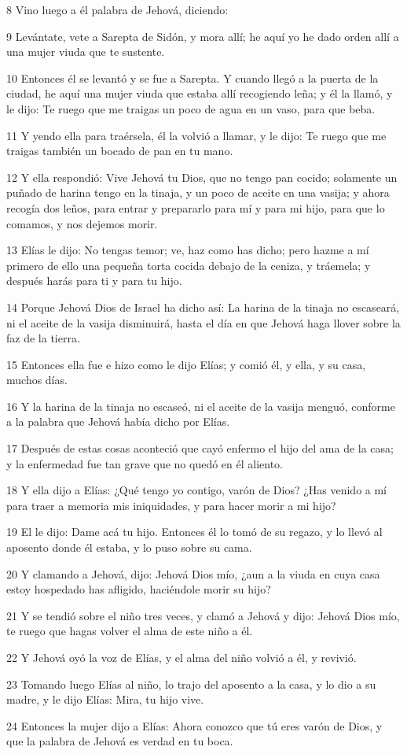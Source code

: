 \par 8 Vino luego a él palabra de Jehová, diciendo:
\par 9 Levántate, vete a Sarepta de Sidón, y mora allí; he aquí yo he dado orden allí a una mujer viuda que te sustente.
\par 10 Entonces él se levantó y se fue a Sarepta. Y cuando llegó a la puerta de la ciudad, he aquí una mujer viuda que estaba allí recogiendo leña; y él la llamó, y le dijo: Te ruego que me traigas un poco de agua en un vaso, para que beba.
\par 11 Y yendo ella para traérsela, él la volvió a llamar, y le dijo: Te ruego que me traigas también un bocado de pan en tu mano.
\par 12 Y ella respondió: Vive Jehová tu Dios, que no tengo pan cocido; solamente un puñado de harina tengo en la tinaja, y un poco de aceite en una vasija; y ahora recogía dos leños, para entrar y prepararlo para mí y para mi hijo, para que lo comamos, y nos dejemos morir. 
\par 13 Elías le dijo: No tengas temor; ve, haz como has dicho; pero hazme a mí primero de ello una pequeña torta cocida debajo de la ceniza, y tráemela; y después harás para ti y para tu hijo.
\par 14 Porque Jehová Dios de Israel ha dicho así: La harina de la tinaja no escaseará, ni el aceite de la vasija disminuirá, hasta el día en que Jehová haga llover sobre la faz de la tierra.
\par 15 Entonces ella fue e hizo como le dijo Elías; y comió él, y ella, y su casa, muchos días.
\par 16 Y la harina de la tinaja no escaseó, ni el aceite de la vasija menguó, conforme a la palabra que Jehová había dicho por Elías.
\par 17 Después de estas cosas aconteció que cayó enfermo el hijo del ama de la casa; y la enfermedad fue tan grave que no quedó en él aliento.
\par 18 Y ella dijo a Elías: ¿Qué tengo yo contigo, varón de Dios? ¿Has venido a mí para traer a memoria mis iniquidades, y para hacer morir a mi hijo?
\par 19 El le dijo: Dame acá tu hijo. Entonces él lo tomó de su regazo, y lo llevó al aposento donde él estaba, y lo puso sobre su cama.
\par 20 Y clamando a Jehová, dijo: Jehová Dios mío, ¿aun a la viuda en cuya casa estoy hospedado has afligido, haciéndole morir su hijo?
\par 21 Y se tendió sobre el niño tres veces, y clamó a Jehová y dijo: Jehová Dios mío, te ruego que hagas volver el alma de este niño a él.
\par 22 Y Jehová oyó la voz de Elías, y el alma del niño volvió a él, y revivió.
\par 23 Tomando luego Elías al niño, lo trajo del aposento a la casa, y lo dio a su madre, y le dijo Elías: Mira, tu hijo vive.
\par 24 Entonces la mujer dijo a Elías: Ahora conozco que tú eres varón de Dios, y que la palabra de Jehová es verdad en tu boca.

